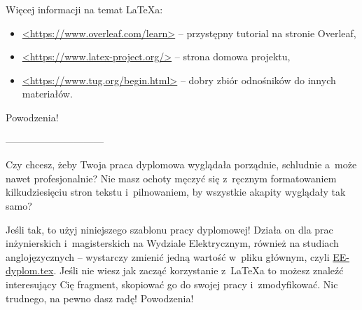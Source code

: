 \begin{flushright}
\end{flushright}

Więcej informacji na temat \LaTeX{a}:
\begin{itemize}
    \item \href{https://www.overleaf.com/learn}{<https://www.overleaf.com/learn>} -- przystępny tutorial na stronie Overleaf,
    \item \href{https://www.latex-project.org/}{<https://www.latex-project.org/>} -- strona domowa projektu,
    \item \href{https://www.tug.org/begin.html}{<https://www.tug.org/begin.html>} -- dobry zbiór odnośników do innych materiałów.
\end{itemize}

\vspace{2ex}
\begin{flushright}
 Powodzenia!
\end{flushright}










------------------------------






Czy chcesz, żeby Twoja praca dyplomowa wyglądała porządnie, schludnie a~może nawet profesjonalnie? Nie masz ochoty męczyć się z~ręcznym formatowaniem kilkudziesięciu stron tekstu i~pilnowaniem, by wszystkie akapity wyglądały tak samo?

Jeśli tak, to użyj niniejszego szablonu pracy dyplomowej! Działa on dla prac inżynierskich i~magisterskich na Wydziale Elektrycznym, również na studiach anglojęzycznych -- wystarczy zmienić jedną wartość w~pliku głównym, czyli \href{./EE-dyplom.tex}{EE-dyplom.tex}. Jeśli nie wiesz jak zacząć korzystanie z~\LaTeX{a} to możesz znaleźć interesujący Cię fragment, skopiować go do swojej pracy i~zmodyfikować. Nic trudnego, na pewno dasz radę! Powodzenia!

